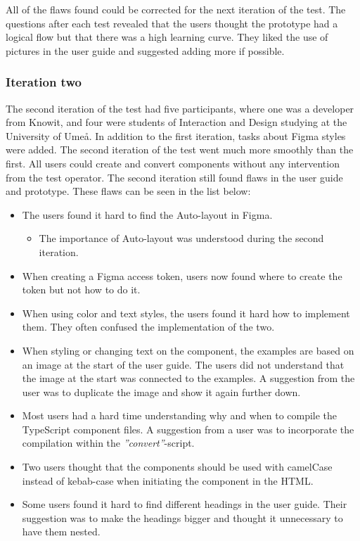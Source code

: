 All of the flaws found could be corrected for the next iteration of the test. The questions after each test revealed that the users thought the prototype had a logical flow but that there was a high learning curve. They liked the use of pictures in the user guide and suggested adding more if possible.  

\subsubsection{Iteration two}%
\label{ssub:Iteration two}
The second iteration of the test had five participants, where one was a developer from Knowit, and four were students of Interaction and Design studying at the University of Umeå. In addition to the first iteration, tasks about Figma styles were added. The second iteration of the test went much more smoothly than the first. All users could create and convert components without any intervention from the test operator. The second iteration still found flaws in the user guide and prototype. These flaws can be seen in the list below:

\begin{itemize}
   \item The users found it hard to find the Auto-layout in Figma.
      \begin{itemize}
         \item The importance of Auto-layout was understood during the second iteration.
      \end{itemize}
   \item When creating a Figma access token, users now found where to create the token but not how to do it.
   \item When using color and text styles, the users found it hard how to implement them. They often confused the implementation of the two. 
   \item When styling or changing text on the component, the examples are based on an image at the start of the user guide. The users did not understand that the image at the start was connected to the examples. A suggestion from the user was to duplicate the image and show it again further down.
   \item Most users had a hard time understanding why and when to compile the TypeScript component files. A suggestion from a user was to incorporate the compilation within the \textit{''convert''}-script.
   \item Two users thought that the components should be used with camelCase instead of kebab-case when initiating the component in the HTML.
   \item Some users found it hard to find different headings in the user guide. Their suggestion was to make the headings bigger and thought it unnecessary to have them nested.
\end{itemize}

